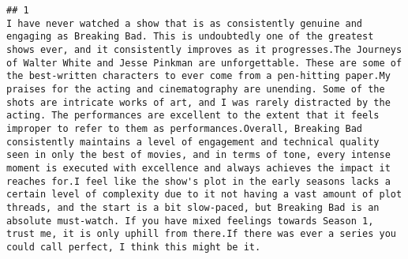 \documentclass[
]{article}
\begin{document}
\begin{verbatim}
## 1                                                                                                                                                                                                                                                                                                                                                                                                                                                                                                                                                                                                                                                                                                                                                                                                                                                                                                                                                                I have never watched a show that is as consistently genuine and engaging as Breaking Bad. This is undoubtedly one of the greatest shows ever, and it consistently improves as it progresses.The Journeys of Walter White and Jesse Pinkman are unforgettable. These are some of the best-written characters to ever come from a pen-hitting paper.My praises for the acting and cinematography are unending. Some of the shots are intricate works of art, and I was rarely distracted by the acting. The performances are excellent to the extent that it feels improper to refer to them as performances.Overall, Breaking Bad consistently maintains a level of engagement and technical quality seen in only the best of movies, and in terms of tone, every intense moment is executed with excellence and always achieves the impact it reaches for.I feel like the show's plot in the early seasons lacks a certain level of complexity due to it not having a vast amount of plot threads, and the start is a bit slow-paced, but Breaking Bad is an absolute must-watch. If you have mixed feelings towards Season 1, trust me, it is only uphill from there.If there was ever a series you could call perfect, I think this might be it.

\end{verbatim}
\end{document}
